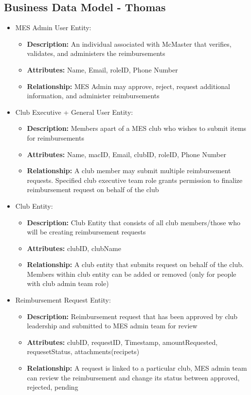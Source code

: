 \documentclass[12pt]{article}
\begin{document}
  \subsection{Business Data Model - Thomas}
  \begin{itemize}
    \item MES Admin User Entity:
      \begin{itemize}
        \item \textbf{Description:} An individual associated with McMaster that verifies, validates, and administers the reimbursements
        \item \textbf{Attributes:} Name, Email, roleID, Phone Number
        \item \textbf{Relationship:} MES Admin may approve, reject, request additional information, and administer reimbursements 
      \end{itemize}
    
    \item Club Executive + General User Entity:
      \begin{itemize}
          \item \textbf{Description:} Members apart of a MES club who wishes to submit items for reimbursements
          \item \textbf{Attributes:} Name, macID, Email, clubID, roleID, Phone Number
          \item \textbf{Relationship:} A club member may submit multiple reimbursement requests. Specified club executive team role grants permission to finalize reimbursement request on behalf of the club
        \end{itemize}

    \item Club Entity:
      \begin{itemize}
          \item \textbf{Description:} Club Entity that consists of all club members/those who will be creating reimbursement requests
          \item \textbf{Attributes:} clubID, clubName
          \item \textbf{Relationship:} A club entity that submits request on behalf of the club. Members within club entity can be added or removed (only for people with club admin team role)
        \end{itemize}
    
    \item Reimbursement Request Entity:
      \begin{itemize}
          \item \textbf{Description:} Reimbursement request that has been approved by club leadership and submitted to MES admin team for review
          \item \textbf{Attributes:} clubID, requestID, Timestamp, amountRequested, requesetStatus, attachments(recipets)
          \item \textbf{Relationship:} A request is linked to a particular club, MES admin team can review the reimbursement and change its status between approved, rejected, pending
        \end{itemize}
    

\end{itemize}
\end{document}
